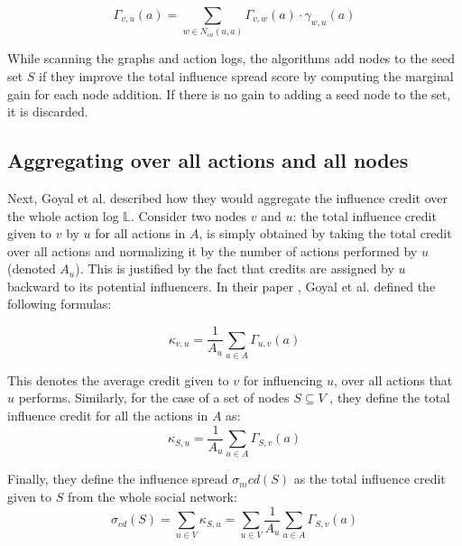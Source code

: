 \documentclass{acm_proc_article-sp}
\begin{document}
\begin{figure}[h]
	\begin{equation}
		\Gamma_{v,u}(a) = \displaystyle\sum_{w \in N_{in}(u,a)} \Gamma_{v,w}(a) \cdot \gamma_{w,u}(a)
	\end{equation}
	\label{CD-formula}
\end{figure}

While scanning the graphs and action logs, the algorithms add nodes to the seed set $S$ if they improve the total influence spread score by computing the marginal gain for each node addition. If there is no gain to adding a seed node to the set, it is discarded.

\subsection*{Aggregating over all actions and all nodes}

Next, Goyal et al. described how they would aggregate the influence credit over the whole action log $\mathbb{L}$. Consider two nodes $v$ and $u$: the total influence credit given to $v$ by $u$ for all actions in $A$, is simply obtained by taking the total credit over all actions and normalizing it by the number of actions performed by $u$ (denoted $A_u$). This is justified by the fact that credits are assigned by $u$ backward to its potential influencers. In their paper \cite{goyal:datainfluence}, Goyal et al. defined the following formulas:

\begin{equation}
	\kappa_{v,u} = \frac{1}{A_u} \displaystyle\sum_{a \in A} \Gamma_{u,v}(a)
\end{equation}

\noindent This denotes the average credit given to $v$ for influencing $u$, over all actions that $u$ performs. Similarly, for the case of a set of nodes $S \subseteq V$ , they define the total influence credit for all the actions in $A$ as:
\begin{equation}
		\kappa_{S,u} = \frac{1}{A_u} \displaystyle\sum_{a \in A} \Gamma_{S,v}(a)
\end{equation}

\noindent Finally, they define the influence spread $\sigma_m{cd}(S)$ as the total influence credit given to $S$ from the whole social network:
\begin{equation}
	\sigma_{cd}(S) = \displaystyle\sum_{u\in V} \kappa_{S,u} = \displaystyle\sum_{u\in V} \frac{1}{A_u} \displaystyle\sum_{a \in A} \Gamma_{S,v}(a)
\end{equation}
\end{document}
